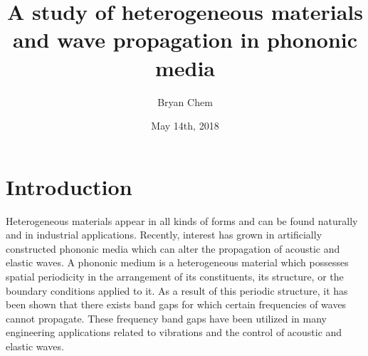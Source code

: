 \documentclass{article}
\title{A study of heterogeneous materials and wave propagation in phononic
media}
\author{Bryan Chem}
\date{May 14th, 2018}
\begin{document}

\maketitle
\newpage


\tableofcontents
\newpage


\section{Introduction}
Heterogeneous materials appear in all kinds of forms and can be found naturally 
and in industrial applications. Recently, interest has grown in artificially
constructed phononic media which can alter the propagation of acoustic and
elastic waves. A phononic medium is a heterogeneous material which possesses
spatial periodicity in the arrangement of its constituents, its structure,
or the boundary conditions applied to it. As a result of this periodic 
structure, it has been shown that there exists band gaps for which certain 
frequencies of waves cannot propagate. These frequency band gaps have been 
utilized in many engineering applications related to vibrations and the control 
of acoustic and elastic waves.
\end{document}
